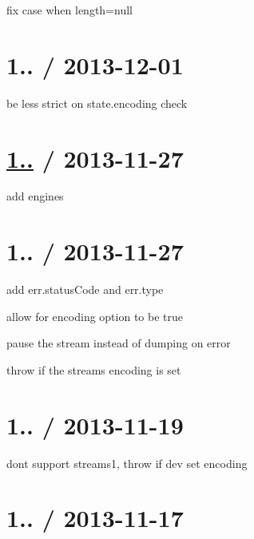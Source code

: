 \begin{DoxyItemize}
\item fix case when length=null
\end{DoxyItemize}

\section*{1.. / 2013-\/12-\/01 }


\begin{DoxyItemize}
\item be less strict on state.\+encoding check
\end{DoxyItemize}

\section*{\hyperlink{namespace1_1_11_1_11}{1..} / 2013-\/11-\/27 }


\begin{DoxyItemize}
\item add engines
\end{DoxyItemize}

\section*{1.. / 2013-\/11-\/27 }


\begin{DoxyItemize}
\item add err.\+status\+Code and err.\+type
\item allow for encoding option to be true
\item pause the stream instead of dumping on error
\item throw if the stream\textquotesingle{}s encoding is set
\end{DoxyItemize}

\section*{1.. / 2013-\/11-\/19 }


\begin{DoxyItemize}
\item dont support streams1, throw if dev set encoding
\end{DoxyItemize}

\section*{1.. / 2013-\/11-\/17 }


